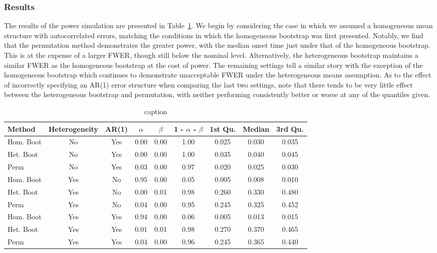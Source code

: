 \subsubsection{Results}


The results of the power simulation are presented in Table~\ref{tab:power_methods}. We begin by considering the case in which we assumed a homogeneous mean structure with autocorrelated errors, matching the conditions in which the homogeneous bootstrap was first presented. Notably, we find that the permutation method demonstrates the greater power, with the median onset time just under that of the homogeneous bootstrap. This is at the expense of a larger FWER, though still below the nominal level. Alternatively, the heterogeneous bootstrap maintains a similar FWER as the homogeneous bootstrap at the cost of power. The remaining settings tell a similar story with the exception of the homogeneous bootstrap which continues to demonstrate unacceptable FWER under the heterogeneous means assumption. As to the effect of incorrectly specifying an AR(1) error structure when comparing the last two settings, note that there tends to be very little effect between the heterogeneous bootstrap and permutation, with neither performing consistently better or worse at any of the quantiles given.


\begin{table}[H]
\centering
\begin{tabular}{lcccccccc}
  \hline
Method & Heterogeneity & AR(1) & $\alpha$ & $\beta$ & 1 - $\alpha$ - $\beta$ & 1st Qu. & Median & 3rd Qu. \\ 
  \hline
Hom. Boot & No & Yes & 0.00 & 0.00 & 1.00 & 0.025 & 0.030 & 0.035 \\ 
  Het. Boot & No & Yes & 0.00 & 0.00 & 1.00 & 0.035 & 0.040 & 0.045 \\ 
  Perm & No & Yes & 0.03 & 0.00 & 0.97 & 0.020 & 0.025 & 0.030 \\
  \hline
  Hom. Boot & Yes & No & 0.95 & 0.00 & 0.05 & 0.005 & 0.008 & 0.010 \\ 
  Het. Boot & Yes & No & 0.00 & 0.01 & 0.98 & 0.260 & 0.330 & 0.480 \\ 
  Perm & Yes & No & 0.04 & 0.00 & 0.95 & 0.245 & 0.325 & 0.452 \\
  \hline
  Hom. Boot & Yes & Yes & 0.94 & 0.00 & 0.06 & 0.005 & 0.013 & 0.015 \\ 
  Het. Boot & Yes & Yes & 0.01 & 0.01 & 0.98 & 0.270 & 0.370 & 0.465 \\ 
  Perm & Yes & Yes & 0.04 & 0.00 & 0.96 & 0.245 & 0.365 & 0.440 \\ 
   \hline
\end{tabular}
\caption{caption} 
\label{tab:power_methods}
\end{table}

